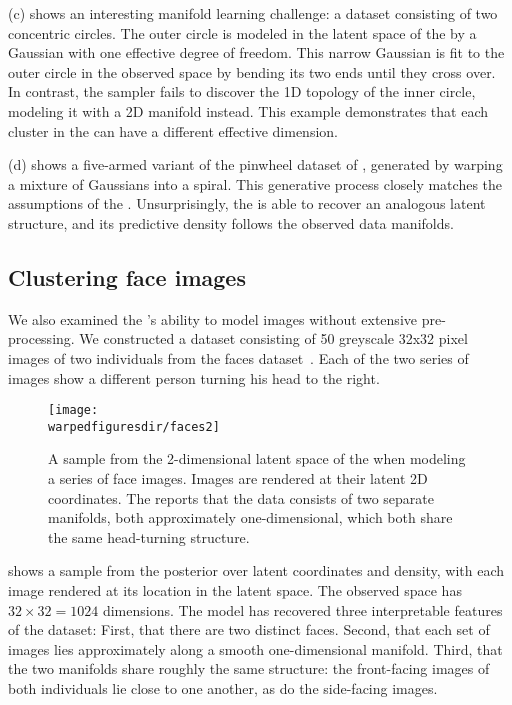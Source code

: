 (c) shows an interesting manifold learning challenge: a dataset consisting of two concentric circles.
The outer circle is modeled in the latent space of the \iwmm{} by a Gaussian with one effective degree of freedom.
This narrow Gaussian is fit to the outer circle in the observed space by bending its two ends until they cross over.
In contrast, the sampler fails to discover the 1D topology of the inner circle, modeling it with a 2D manifold instead.
This example demonstrates that each cluster in the \iwmm{} can have a different effective dimension.

(d) shows a five-armed variant of the pinwheel dataset of \citet{adams2009archipelago}, generated by warping a mixture of Gaussians into a spiral.
This generative process closely matches the assumptions of the \iwmm{}.
Unsurprisingly, the \iwmm{} is able to recover an analogous latent structure, and its predictive density follows the observed data manifolds.





\subsection{Clustering face images}

We also examined the \iwmm{}'s ability to model images without extensive pre-processing.
We constructed a dataset consisting of 50 greyscale 32x32 pixel images of two individuals from the \UMIST{} faces dataset~\citep{umistfaces}.
Each of the two series of images show a different person turning his head to the right.

\begin{figure}[h!]
\centering
\texttt{[image: \\warpedfiguresdir/faces2]}
\caption[Latent clusters of face images]{A sample from the 2-dimensional latent space of the \iwmm{} when modeling a series of face images.
Images are rendered at their latent 2D coordinates.
The \iwmm{} reports that the data consists of two separate manifolds, both approximately one-dimensional, which both share the same head-turning structure.}
\label{fig:faces}
\end{figure}

 shows a sample from the posterior over latent coordinates and density, with each image rendered at its location in the latent space.
The observed space has $32 \times 32 = 1024$ dimensions.
The model has recovered three interpretable features of the dataset:
First, that there are two distinct faces.
Second, that each set of images lies approximately along a smooth one-dimensional manifold.
Third, that the two manifolds share roughly the same structure: the front-facing images of both individuals lie close to one another, as do the side-facing images.






